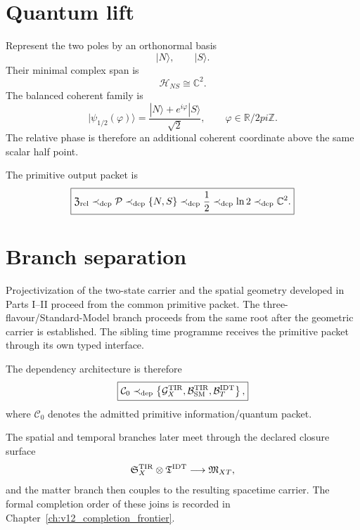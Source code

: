 \documentclass[11pt,a4paper,twoside]{book}
\def\pi{pi}%
\theoremstyle{definition}
\begin{document}
\section{Quantum lift}

Represent the two poles by an orthonormal basis
\[
|N\rangle,\qquad |S\rangle.
\]
Their minimal complex span is
\begin{equation}
\boxed{\mathcal H_{NS}\cong\mathbb C^2.}
\label{eq:v12_binary_c2}
\end{equation}
The balanced coherent family is
\begin{equation}
\boxed{
|\psi_{1/2}(\varphi)\rangle
=\frac{|N\rangle+e^{i\varphi}|S\rangle}{\sqrt2},
\qquad
\varphi\in\mathbb R/2\pi\mathbb Z.
}
\label{eq:v12_balanced_spinor}
\end{equation}
The relative phase is therefore an additional coherent coordinate above the same scalar half point.

The primitive output packet is
\begin{equation}
\boxed{
\mathfrak Z_{\rm rel}
\prec_{\rm dep}
\mathcal P
\prec_{\rm dep}
\{N,S\}
\prec_{\rm dep}
\frac12
\prec_{\rm dep}
\ln2
\prec_{\rm dep}
\mathbb C^2.
}
\label{eq:v12_primitive_packet}
\end{equation}

\section{Branch separation}

Projectivization of the two-state carrier and the spatial geometry developed in Parts I--II proceed from the common primitive packet. The three-flavour/Standard-Model branch proceeds from the same root after the geometric carrier is established. The sibling time programme receives the primitive packet through its own typed interface.

The dependency architecture is therefore
\[
\boxed{
\mathcal C_0
\prec_{\rm dep}
\left\{
\mathcal G_X^{\rm TIR},
\mathcal B_{\rm SM}^{\rm TIR},
\mathcal B_T^{\rm IDT}
\right\},
}
\]
where $\mathcal C_0$ denotes the admitted primitive information/quantum packet.

The spatial and temporal branches later meet through the declared closure surface
\begin{equation}
\mathfrak S_X^{\rm TIR}\otimes\mathfrak T^{\rm IDT}
\longrightarrow
\mathfrak M_{XT},
\end{equation}
and the matter branch then couples to the resulting spacetime carrier. The formal completion order of these joins is recorded in Chapter~\ref{ch:v12_completion_frontier}.
\end{document}
